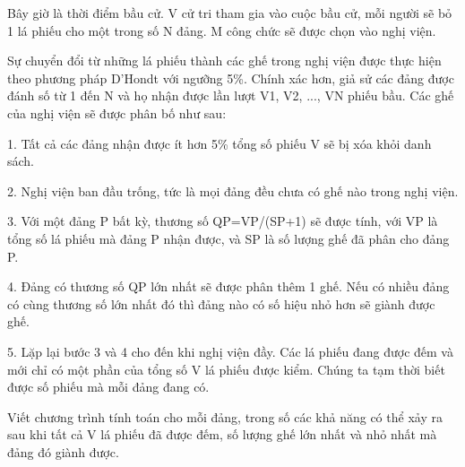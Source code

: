 Bây giờ là thời điểm bầu cử. V cử tri tham gia vào cuộc bầu cử, mỗi người sẽ bỏ 1 lá phiếu cho một trong số N đảng. M công chức sẽ được chọn vào nghị viện.  

   Sự chuyển đổi từ những lá phiếu thành các ghế trong nghị viện được thực hiện theo phương pháp D'Hondt với ngưỡng 5\%. Chính xác hơn, giả sử các đảng được đánh số từ 1 đến N và họ nhận được lần lượt V1, V2, ..., VN phiếu bầu. Các ghế của nghị viện sẽ được phân bố như sau:  
\begin{itemize}

    1. Tất cả các đảng nhận được ít hơn 5\% tổng số phiếu V sẽ bị xóa khỏi danh sách.   

    2. Nghị viện ban đầu trống, tức là mọi đảng đều chưa có ghế nào trong nghị viện.   

    3. Với một đảng P bất kỳ, thương số QP=VP/(SP+1) sẽ được tính, với VP là tổng số lá phiếu mà đảng P nhận được, và SP là số lượng ghế đã phân cho đảng P.   

    4. Đảng có thương số QP lớn nhất sẽ được phân thêm 1 ghế. Nếu có nhiều đảng có cùng thương số lớn nhất đó thì đảng nào có số hiệu nhỏ hơn sẽ giành được ghế.   

    5. Lặp lại bước 3 và 4 cho đến khi nghị viện đầy. Các lá phiếu đang được đếm và mới chỉ có một phần của tổng số V lá phiếu được kiểm. Chúng ta tạm thời biết được số phiếu mà mỗi đảng đang có.   
\end{itemize}

   Viết chương trình tính toán cho mỗi đảng, trong số các khả năng có thể xảy ra sau khi tất cả V lá phiếu đã được đếm, số lượng ghế lớn nhất và nhỏ nhất mà đảng đó giành được.  

\